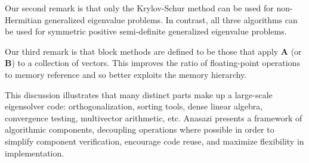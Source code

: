 \documentclass[acmtoms]{acmtrans2m}
\newcounter{algorithm}
\begin{document}
Our second remark is that only the Krylov-Schur method can be used
for non-Hermitian generalized eigenvalue problems. In contrast, all
three algorithms can be used for symmetric positive semi-definite
generalized eigenvalue problems.

Our third remark is that block methods are defined to be those that
apply $\mathbf{A}$ (or $\mathbf{B}$) to a collection of vectors.
This improves the ratio of floating-point operations to memory
reference and so better exploits the memory hierarchy.

This discussion illustrates that many distinct parts make up a
large-scale eigensolver code: orthogonalization, sorting tools, dense
linear algebra, convergence testing, multivector arithmetic, etc.
Anasazi presents a framework of algorithmic components, decoupling
operations where possible in order to simplify component verification,
encourage code reuse, and maximize flexibility in implementation.

\end{document}
